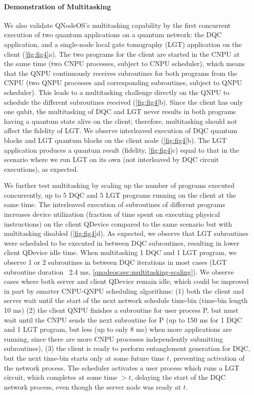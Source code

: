 \paragraph{Demonstration of Multitasking}
We also validate QNodeOS's multitasking capability by the first concurrent execution of two quantum applications on a quantum network: the DQC application, and a single-node local gate tomography (LGT) application on the client (\cref{fig:fig4}a). The two programs for the client are started in the CNPU at the same time (two CNPU processes, subject to CNPU scheduler), which means that the QNPU continuously receives subroutines for both programs from the CNPU (two QNPU processes and corresponding subroutines, subject to QNPU scheduler). This leads to a multitasking challenge directly on the QNPU to schedule the different subroutines received (\cref{fig:fig4}b). Since the client has only one qubit, the multitasking of DQC and LGT never results in both programs having a quantum state alive on the client; therefore, multitasking should not affect the fidelity of LGT. We observe interleaved execution of DQC quantum blocks and LGT quantum blocks on the client node (\cref{fig:fig4}b). The LGT application produces a quantum result (fidelity, \cref{fig:fig4}c) equal to that in the scenario where we run LGT on its own (not interleaved by DQC circuit executions), as expected.

We further test multitasking by scaling up the number of programs executed concurrently, up to 5 DQC and 5 LGT programs running on the client at the same time. The interleaved execution of subroutines of different programs increases device utilization (fraction of time spent on executing physical instructions) on the client QDevice compared to the same scenario but with multitasking disabled (\cref{fig:fig4}d). As expected, we observe that LGT subroutines were scheduled to be executed in between DQC subroutines, resulting in lower client QDevice idle time. When multitasking 1 DQC and 1 LGT program, we observe 1 or 2 subroutines in between DQC iterations in most cases (LGT subroutine duration ~2.4 ms, \cref{qnodeos:sec:multitasking-scaling}). We observe cases where both server and client QDevice remain idle, which could be improved in part by smarter CNPU-QNPU scheduling algorithms: (1) both the client and server wait until the start of the next network schedule time-bin (time-bin length 10 ms) (2) the client QNPU finishes a subroutine for user process P, but must wait until the CNPU sends the next subroutine for P (up to 150 ms for 1 DQC and 1 LGT program, but less (up to only 8 ms) when more applications are running, since there are more CNPU processes independently submitting subroutines), (3) the client is ready to perform entanglement generation for DQC, but the next time-bin starts only at some future time $t$, preventing activation of the network process. The scheduler activates a user process which runs a LGT circuit, which completes at some time $>t$, delaying the start of the DQC network process, even though the server node was ready at $t$.


